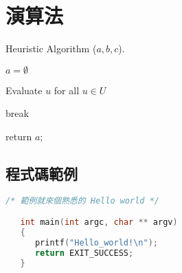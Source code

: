 \chapter{演算法}\label{algorithm}

\begin{algorithm}
    \caption{ Heuristic Algorithm ($a,b,c$).}
    \label{alg:main}
    \begin{algorithmic}[1]

    \State $a = \emptyset$

        \State Evaluate $u$ for all $u \in U$


            \State break

        \EndIf

    \EndWhile
    \State return $a$;

    \end{algorithmic}
\end{algorithm}


\section{程式碼範例}

\begin{lstlisting}[language=C]
   /* 範例就來個熟悉的 Hello world */

   int main(int argc, char ** argv) 
   { 
      printf("Hello_world!\n");
      return EXIT_SUCCESS; 
   }
\end{lstlisting}
